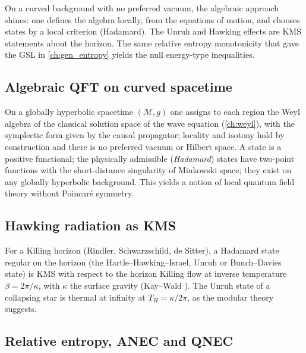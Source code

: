 \mshift{7mm}\begin{physmotiv}
On a curved background with no preferred vacuum, the algebraic approach shines: one defines the algebra locally, from the equations of motion, and chooses states by a local criterion (Hadamard). The Unruh and Hawking effects are KMS statements about the horizon. The same relative entropy monotonicity that gave the GSL in \cref{ch:gen_entropy} yields the null energy-type inequalities.
\end{physmotiv}

\subsection{Algebraic QFT on curved spacetime}

On a globally hyperbolic spacetime $(\mathcal M,g)$ one assigns to each region the Weyl algebra of the classical solution space of the wave equation (\cref{ch:weyl}), with the symplectic form given by the causal propagator; locality and isotony hold by construction and there is no preferred vacuum or Hilbert space. A state is a positive functional; the physically admissible (\emph{Hadamard}) states have two-point functions with the short-distance singularity of Minkowski space; they exist on any globally hyperbolic background. This yields a notion of local quantum field theory without Poincar\'e symmetry.

\subsection{Hawking radiation as KMS}

For a Killing horizon (Rindler, Schwarzschild, de Sitter), a Hadamard state regular on the horizon (the Hartle--Hawking--Israel, Unruh or Bunch--Davies state) is KMS with respect to the horizon Killing flow at inverse temperature $\beta=2\pi/\kappa$, with $\kappa$ the surface gravity (Kay--Wald \cite{KayWald1991}). The Unruh state of a collapsing star is thermal at infinity at $T_H=\kappa/2\pi$, as the modular theory suggests.

\subsection{Relative entropy, ANEC and QNEC}

